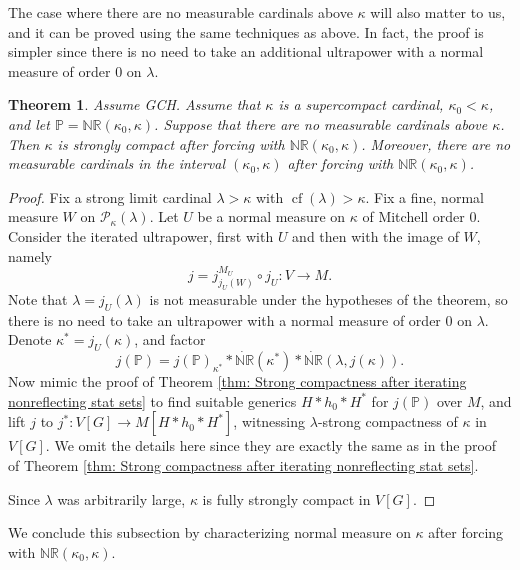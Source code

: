 \documentclass[11pt]{amsart}
\newtheorem{theorem}{Theorem}[section]
\theoremstyle{definition}
\theoremstyle{remark}
\newcommand\<{{<}}
\DeclareMathOperator{\cf}{cf}
\newcommand{\po}{\mathbb{P}}
\begin{document}
    The case where there are no measurable cardinals above $\kappa$ will also matter to us, and it can be proved using the same techniques as above. In fact, the proof is simpler since there is no need to take an additional ultrapower with a normal measure of order $0$ on $\lambda$.

\begin{theorem}\label{thm: Strong compactness after iterating nonreflecting stat sets when there are no measurable cardinals above} 
        Assume {\rm{GCH}}. Assume that $\kappa$ is a supercompact cardinal, $\kappa_0<\kappa$, and let $\po = \mathbb{NR}(\kappa_0, \kappa)$. Suppose that there are no measurable cardinals above $\kappa$. Then $\kappa$ is strongly compact after forcing with $\mathbb{NR}(\kappa_0, \kappa)$. Moreover, there are no measurable cardinals in the interval $(\kappa_0, \kappa)$ after forcing with $\mathbb{NR}(\kappa_0, \kappa)$.
    \end{theorem}

    \begin{proof}
        Fix a strong limit cardinal  $\lambda>\kappa$ with $\cf(\lambda)> \kappa$. 
        Fix a fine, normal measure $W$ on $\mathcal{P}_\kappa(\lambda)$. Let $U$ be a normal measure on $\kappa$ of Mitchell order $0$. Consider the iterated ultrapower, first with $U$ and then with the image of $W$, namely 
        $$j = j^{M_U}_{j_{U}(W)}\circ j_U\colon V\to M.$$
        Note that $\lambda = j_U(\lambda)$ is not measurable under the hypotheses of the theorem, so there is no need to take an ultrapower with a normal measure of order $0$ on $\lambda$. Denote $\kappa^* = j_U(\kappa)$, and factor 
        $$j(\po) = j(\po)_{\kappa^*}\ast \dot{\mathbb{NR}}(\kappa^*) \ast \dot{\mathbb{NR}}(\lambda, j(\kappa)).$$
        Now mimic the proof of Theorem \ref{thm: Strong compactness after iterating nonreflecting stat sets} to find suitable generics $H*h_0*H^*$ for $j(\po)$ over $M$, and lift $j$ to $j^*\colon V[G]\to M[H*h_0*H^*]$, witnessing $\lambda$-strong compactness of $\kappa$ in $V[G]$. We omit the details here since they are exactly the same as in the proof of Theorem \ref{thm: Strong compactness after iterating nonreflecting stat sets}.
        
        Since $\lambda$ was arbitrarily large, $\kappa$ is fully strongly compact in $V[G]$.
    \end{proof}


We conclude this subsection by characterizing normal measure on $\kappa$ after forcing with $\mathbb{NR}(\kappa_0, \kappa)$.
\end{document}
